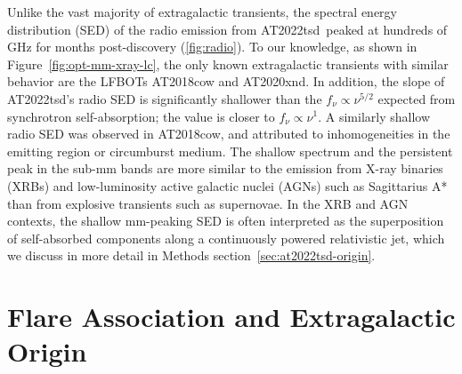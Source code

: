 \documentclass{nature_plusfigure}
\newcommand{\at}{AT2022tsd}
\begin{document}
\begin{methods}
Unlike the vast majority of extragalactic transients, the spectral energy distribution (SED) of the radio emission from \at\ peaked at hundreds of GHz for months post-discovery (\ref{fig:radio}). To our knowledge, as shown in Figure~\ref{fig:opt-mm-xray-lc}, the only known extragalactic transients with similar behavior are the LFBOTs AT2018cow\cite{Ho2019} and AT2020xnd\cite{Ho2022_AT2020xnd,Bright2022}.
In addition, the slope of \at's radio SED is significantly shallower than the $f_\nu \propto \nu^{5/2}$ expected from synchrotron self-absorption\cite{Rybicki1986}; the value is closer to $f_\nu \propto \nu^{1}$. A similarly shallow radio SED was observed in AT2018cow\cite{Nayana2021}, and attributed to inhomogeneities in the emitting region or circumburst medium\cite{Nayana2021}.
The shallow spectrum and the persistent peak in the sub-mm bands are more similar to the emission from X-ray binaries (XRBs\cite{Fender2001,Tetarenko2021,Fender2023}) and low-luminosity active galactic nuclei (AGNs) such as Sagittarius A*\cite{Falcke1998} than from explosive transients such as supernovae\cite{Chevalier1998}. 
In the XRB and AGN contexts, the shallow mm-peaking SED is often interpreted as the superposition of self-absorbed components along a continuously powered relativistic jet\cite{Blandford1979}, which we discuss in more detail in Methods section~\ref{sec:at2022tsd-origin}.

\section{Flare Association and Extragalactic Origin}
\label{sec:flare-association}


\end{methods}
\end{document}
